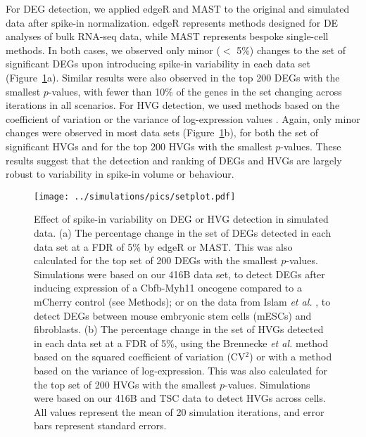 \documentclass{article}
\begin{document}
For DEG detection, we applied edgeR \cite{robinson2010edgeR} and MAST \cite{finak2015mast} to the original and simulated data after spike-in normalization.
edgeR represents methods designed for DE analyses of bulk RNA-seq data, while MAST represents bespoke single-cell methods.
In both cases, we observed only minor ($<$ 5\%) changes to the set of significant DEGs upon introducing spike-in variability in each data set (Figure~\ref{fig:setchange}a). 
Similar results were also observed in the top 200 DEGs with the smallest $p$-values, with fewer than 10\% of the genes in the set changing across iterations in all scenarios.
For HVG detection, we used methods based on the coefficient of variation \cite{brennecke2013accounting} or the variance of log-expression values \cite{lun2016stepbystep}.
Again, only minor changes were observed in most data sets (Figure~\ref{fig:setchange}b), for both the set of significant HVGs and for the top 200 HVGs with the smallest $p$-values.
These results suggest that the detection and ranking of DEGs and HVGs are largely robust to variability in spike-in volume or behaviour.

\begin{figure}[bt]
    \begin{center}
        \texttt{[image: ../simulations/pics/setplot.pdf]}
    \end{center}
    \caption{Effect of spike-in variability on DEG or HVG detection in simulated data.
        (a) The percentage change in the set of DEGs detected in each data set at a FDR of 5\% by edgeR or MAST.
        This was also calculated for the top set of 200 DEGs with the smallest $p$-values.
        Simulations were based on our 416B data set, to detect DEGs after inducing expression of a Cbfb-Myh11 oncogene compared to a mCherry control (see Methods);
        or on the data from Islam \textit{et al.} \cite{islam2011characterization}, to detect DEGs between mouse embryonic stem cells (mESCs) and fibroblasts.
        (b) The percentage change in the set of HVGs detected in each data set at a FDR of 5\%,
        using the Brennecke \textit{et al.} method based on the squared coefficient of variation (CV$^2$) or with a method based on the variance of log-expression.
        This was also calculated for the top set of 200 HVGs with the smallest $p$-values.
        Simulations were based on our 416B and TSC data to detect HVGs across cells.
        All values represent the mean of 20 simulation iterations, and error bars represent standard errors.
    }
    \label{fig:setchange}
\end{figure}
\end{document}
